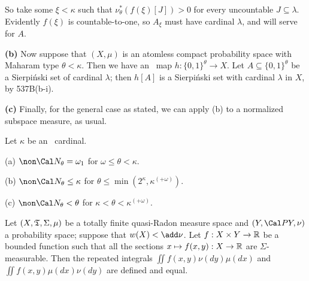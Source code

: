 {So take some $\xi<\kappa$ such that
$\nu_{\theta}^*(f(\xi)[J])>0$ for every uncountable
$J\subseteq\lambda$.   Evidently $f(\xi)$
is countable-to-one, so $A_{\xi}$ must have cardinal
$\lambda$, and will serve for $A$.

\medskip

{\bf (b)} Now suppose that $(X,\mu)$ is an atomless compact probability
space with Maharam type $\theta<\kappa$.   Then we have an \imp\ map
$h:\{0,1\}^{\theta}\to X$.   Let $A\subseteq\{0,1\}^{\theta}$ be a
Sierpi\'nski set of
cardinal $\lambda$;  then $h[A]$ is a Sierpi\'nski set with cardinal
$\lambda$ in $X$, by 537B(b-i).

\medskip

{\bf (c)} Finally, for the general case as stated, we can apply (b) to a
normalized subspace measure, as usual.
}%

 Let $\kappa$ be an \am\ cardinal.

(a) $\non\Cal N_{\theta}=\omega_1$ for
$\omega\le\theta<\kappa$.

(b) $\non\Cal N_{\theta}\le\kappa$ for
$\theta\le\min(2^{\kappa},\kappa^{(+\omega)})$.

(c) $\non\Cal N_{\theta}<\theta$ for
$\kappa<\theta<\kappa^{(+\omega)}$.



 Let $(X,\frak T,\Sigma,\mu)$ be a totally
finite
quasi-Radon measure space and $(Y,\Cal PY,\nu)$ a probability space;
suppose that $w(X)<\add\nu$.   Let $f:X\times Y\to\Bbb R$ be a
bounded function such that all the sections
$x\mapsto f(x,y):X\to\Bbb R$ are $\Sigma$-measurable.   Then
the repeated integrals $\iint f(x,y)\nu(dy)\mu(dx)$ and
$\iint f(x,y)\mu(dx)\nu(dy)$ are defined and equal.

